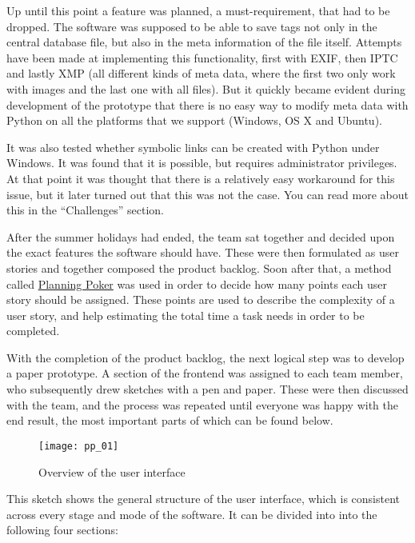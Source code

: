 Up until this point a feature was planned, a must-requirement, that had to be
dropped. The software was supposed to be able to save tags not only in the
central database file, but also in the meta information of the file itself.
Attempts have been made at implementing this functionality, first with EXIF,
then IPTC and lastly XMP (all different kinds of meta data, where the first two
only work with images and the last one with all files). But it quickly became
evident during development of the prototype that there is no easy way to modify
meta data with Python on all the platforms that we support (Windows, OS X and
Ubuntu).

It was also tested whether symbolic links can be created with Python under
Windows. It was found that it is possible, but requires administrator
privileges. At that point it was thought that there is a relatively easy
workaround for this issue, but it later turned out that this was not the case.
You can read more about this in the ``Challenges'' section. %

After the summer holidays had ended, the team sat together and decided upon the
exact features the software should have. These were then formulated as user
stories and together composed the product backlog. Soon after that, a method
called \href{https://en.wikipedia.org/wiki/Planning_poker}{Planning Poker} was
used in order to decide how many points each user story should be assigned.
These points are used to describe the complexity of a user story, and help
estimating the total time a task needs in order to be completed.

With the completion of the product backlog, the next logical step was to
develop a paper prototype. A section of the frontend was assigned to each team
member, who subsequently drew sketches with a pen and paper. These were then
discussed with the team, and the process was repeated until everyone was happy
with the end result, the most important parts of which can be found below.

\begin{figure}
	\centering
	\texttt{[image: pp\_01]}
	\caption{Overview of the user interface}
\end{figure}

This sketch shows the general structure of the user interface, which is
consistent across every stage and mode of the software. It can be divided into
into the following four sections:

